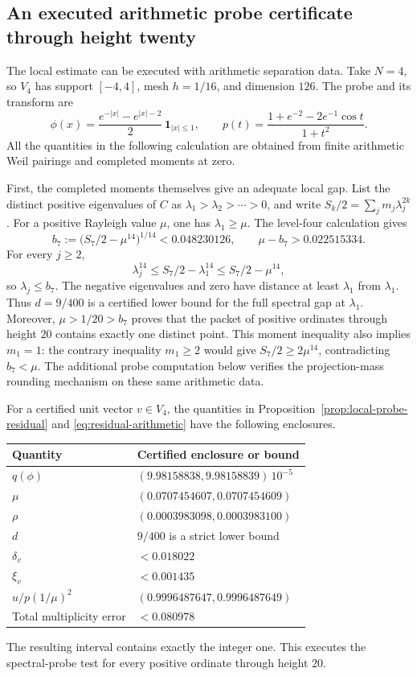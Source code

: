 \subsection{An executed arithmetic probe certificate through height twenty}
\label{sec:executed-probe}

The local estimate can be executed with arithmetic separation data.
Take $N=4$, so $V_4$ has support $[-4,4]$, mesh $h=1/16$, and
dimension $126$.  The probe and its transform are
\[
 \phi(x)=\frac{e^{-|x|}-e^{|x|-2}}2\,\mathbf1_{|x|\le1},
 \qquad
 p(t)=\frac{1+e^{-2}-2e^{-1}\cos t}{1+t^2}.
\]
All the quantities in the following calculation are obtained from
finite arithmetic Weil pairings and completed moments at zero.

First, the completed moments themselves give an adequate local gap.
List the distinct positive eigenvalues of $C$ as
$\lambda_1>\lambda_2>\cdots>0$, and write
$S_k/2=\sum_jm_j\lambda_j^{2k}$.  For a positive Rayleigh value
$\mu$, one has $\lambda_1\ge\mu$.  The level-four calculation gives
\[
 b_7:=\bigl(S_7/2-\mu^{14}\bigr)^{1/14}
       <0.048230126,
 \qquad \mu-b_7>0.022515334.
\]
For every $j\ge2$,
\[
 \lambda_j^{14}\le S_7/2-\lambda_1^{14}
                        \le S_7/2-\mu^{14},
\]
so $\lambda_j\le b_7$.  The negative eigenvalues and zero have
distance at least $\lambda_1$ from $\lambda_1$.  Thus $d=9/400$
is a certified lower bound for the full spectral gap at $\lambda_1$.
Moreover, $\mu>1/20>b_7$ proves that the packet of positive ordinates
through height $20$ contains exactly one distinct point.
This moment inequality also implies $m_1=1$: the contrary inequality
$m_1\ge2$ would give $S_7/2\ge2\mu^{14}$, contradicting $b_7<\mu$.
The additional probe computation below verifies the projection-mass
rounding mechanism on these same arithmetic data.

\begin{proposition}
\label{prop:executed-local-probe}
For a certified unit vector $v\in V_4$, the quantities in
Proposition~\ref{prop:local-probe-residual} and
\eqref{eq:residual-arithmetic} have the following enclosures.
\begin{center}
\begin{tabular}{ll}
\hline
Quantity & Certified enclosure or bound\\
\hline
$q(\phi)$ & $(9.98158838,9.98158839)\,10^{-5}$\\
$\mu$ & $(0.0707454607,0.0707454609)$\\
$\rho$ & $(0.0003983098,0.0003983100)$\\
$d$ & $9/400$ is a strict lower bound\\
$\delta_v$ & $<0.018022$\\
$\xi_v$ & $<0.001435$\\
$u/p(1/\mu)^2$ & $(0.9996487647,0.9996487649)$\\
Total multiplicity error & $<0.080978$\\
\hline
\end{tabular}
\end{center}
The resulting interval contains exactly the integer one.  This
executes the spectral-probe test for every positive ordinate through
height $20$.
\end{proposition}


